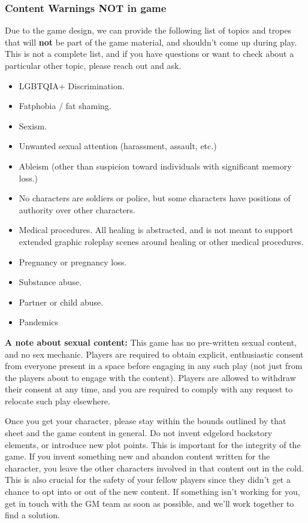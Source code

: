 \documentclass[sheet]{GL2020}
\begin{document}
\subsubsection{Content Warnings NOT in game}
Due to the game design, we can provide the following list of topics and tropes that will \textbf{not} be part of the game material, and shouldn't come up during play. This is not a complete list, and if you have questions or want to check about a particular other topic, please reach out and ask.

\begin{multicols}{2}
\begin{itemize}
  	\item LGBTQIA+ Discrimination.
	\item Fatphobia / fat shaming.
	\item Sexism.
\item Unwanted sexual attention (harassment, assault, etc.)
	\item Ableism (other than suspicion toward individuals with significant memory loss.)
	\item No characters are soldiers or police, but some characters have positions of authority over other characters.
	\item Medical procedures. All healing is abstracted, and is not meant to support extended graphic roleplay scenes around healing or other medical procedures.
	\item Pregnancy or pregnancy loss.
	\item Substance abuse.
	\item Partner or child abuse.
	\item Pandemics
\end{itemize}
\end{multicols}

\textbf{A note about sexual content:} This game has no pre-written sexual content, and no sex mechanic. Players are required to obtain explicit, enthusiastic consent from everyone present in a space before engaging in any such play (not just from the players about to engage with the content). Players are allowed to withdraw their consent at any time, and you are required to comply with any request to relocate such play elsewhere.

Once you get your character, please stay within the bounds outlined by that sheet and the game content in general. Do not invent edgelord backstory elements, or introduce new plot points. This is important for the integrity of the game. If you invent something new and abandon content written for the character, you leave the other characters involved in that content out in the cold. This is also crucial for the safety of your fellow players since they didn't get a chance to opt into or out of the new content. If something isn't working for you, get in touch with the GM team as soon as possible, and we'll work together to find a solution.
\end{document}

